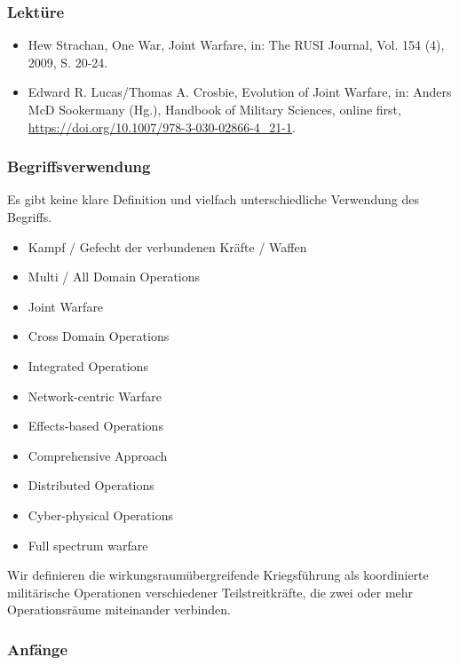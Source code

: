 {}\documentclass[a4paper]{article}
\providecommand{\tightlist}{\setlength{\itemsep}{1mm}\setlength{\parskip}{1mm}}
\begin{document}
\subsubsection{Lektüre}\label{lektuxfcre}

\begin{itemize}
	\tightlist
	\item
	      Hew Strachan, One War, Joint Warfare, in: The RUSI Journal, Vol. 154
	      (4), 2009, S. 20-24.
	\item
	      Edward R. Lucas/Thomas A. Crosbie, Evolution of Joint Warfare, in:
	      Anders McD Sookermany (Hg.), Handbook of Military Sciences, online
	      first, \url{https://doi.org/10.1007/978-3-030-02866-4_21-1}.
\end{itemize}

\subsubsection{Begriffsverwendung}\label{begriffsverwendung}

Es gibt keine klare Definition und vielfach unterschiedliche Verwendung
des Begriffs.

\begin{itemize}
	\tightlist
	\item
	      Kampf / Gefecht der verbundenen Kräfte / Waffen
	\item
	      Multi / All Domain Operations
	\item
	      Joint Warfare
	\item
	      Cross Domain Operations
	\item
	      Integrated Operations
	\item
	      Network-centric Warfare
	\item
	      Effects-based Operations
	\item
	      Comprehensive Approach
	\item
	      Distributed Operations
	\item
	      Cyber-physical Operations
	\item
	      Full spectrum warfare
\end{itemize}

Wir definieren die wirkungsraumübergreifende Kriegsführung als
koordinierte militärische Operationen verschiedener Teilstreitkräfte,
die zwei oder mehr Operationsräume miteinander verbinden.

\subsubsection{Anfänge}\label{anfuxe4nge}
\end{document}
